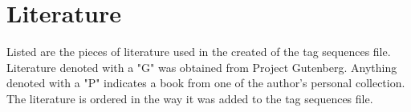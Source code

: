 \documentclass[11pt,a4paper]{article}
\begin{document}
\pagebreak

\appendix
\appendixpage

\section{Literature}
Listed are the pieces of literature used in the created of the tag sequences file. Literature denoted with a "G" was obtained from Project Gutenberg. Anything denoted with a "P" indicates a book from one of the author's personal collection. The literature is ordered in the way it was added to the tag sequences file.
\end{document}
